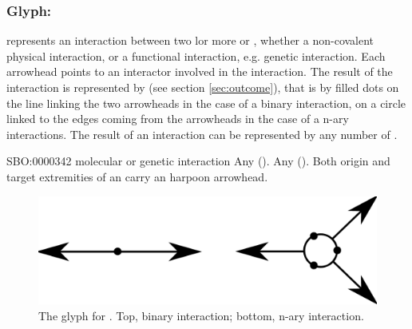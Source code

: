 \color{blue}

\subsubsection{Glyph: }\label{sec:interaction}

 represents an interaction between two lor more  or , whether a non-covalent physical interaction, or a functional interaction, e.g. genetic interaction. Each arrowhead points to an interactor involved in the interaction. The result of the interaction is represented by  (see section \ref{sec:outcome}), that is by filled dots on the line linking the two arrowheads in the case of a binary interaction, on a circle linked to the edges coming from the arrowheads in the case of a  n-ary interactions. The result of an interaction can be represented by any number of .

\begin{glyphDescription}
 \glyphSboTerm SBO:0000342 molecular or genetic interaction
 \glyphOrigin Any  ().
 \glyphTarget Any  ().
 \glyphEndPoint Both origin and target extremities of an  carry an harpoon arrowhead.
 \end{glyphDescription}

\begin{figure}[H]
  \centering
  \includegraphics[scale = 0.3]{images/interaction}
  \caption{The \ER glyph for . Top, binary interaction; bottom, n-ary interaction.}
  \label{fig:interaction}
\end{figure}

